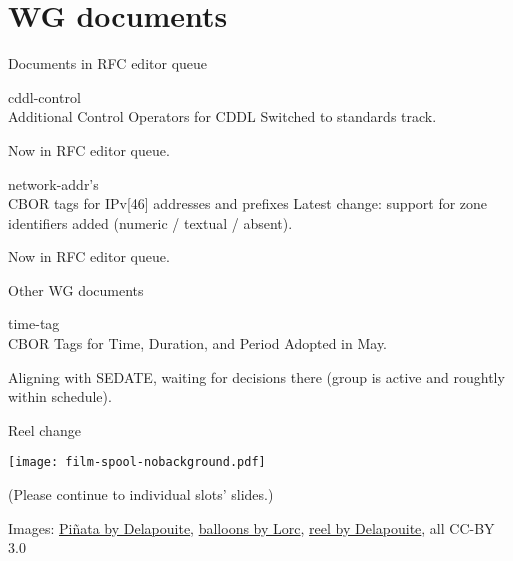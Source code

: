 \documentclass[aspectratio=169]{beamer}
\begin{document}
\section*{WG documents}

\begin{frame}{Documents in RFC editor queue}\Large

    \begin{block}{\Large cddl-control \\ \small Additional Control Operators for CDDL}
        Switched to standards track.

        \bigskip

        Now in RFC editor queue.
    \end{block}

    \bigskip

    \begin{block}{\Large \mbox{network-addr's} \\ \small CBOR tags for IPv[46] addresses and prefixes}
        Latest change: support for zone identifiers added (numeric / textual / absent).

        \bigskip

        Now in RFC editor queue.
    \end{block}

\end{frame}

\begin{frame}{Other WG documents}\Large

    \begin{block}{\Large time-tag \\ \small CBOR Tags for Time, Duration, and Period}
        Adopted in May.

        \bigskip

        Aligning with SEDATE, waiting for decisions there (group is active and roughtly within schedule).
    \end{block}
\end{frame}

\begin{frame}{Reel change}
    \begin{block}{\texttt{[image: film-spool-nobackground.pdf]}\mbox{\quad}}
        \mbox{}

        \vspace{-1.7cm}

        (Please continue to individual slots' slides.)
    \end{block}

    \vfill
    \tiny Images:
    \href{https://game-icons.net/1x1/delapouite/pinata.html}{Piñata by Delapouite},
    \href{https://game-icons.net/1x1/lorc/balloons.html}{balloons by Lorc},
    \href{https://game-icons.net/1x1/delapouite/film-spool.html}{reel by Delapouite}, all CC-BY 3.0
\end{frame}
\end{document}
